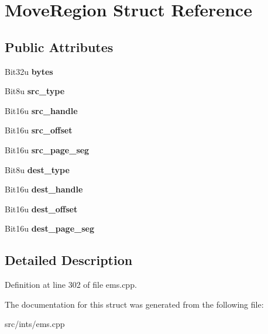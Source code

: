 \hypertarget{structMoveRegion}{\section{Move\-Region Struct Reference}
\label{structMoveRegion}
}
\subsection*{Public Attributes}
\begin{DoxyCompactItemize}
\item 
\hypertarget{structMoveRegion_ada38b05b3446e335d841d650849f9d5d}{Bit32u {\bfseries bytes}}\label{structMoveRegion_ada38b05b3446e335d841d650849f9d5d}

\item 
\hypertarget{structMoveRegion_a58be32d3a89f3d138f8e5f9b2f6ac045}{Bit8u {\bfseries src\-\_\-type}}\label{structMoveRegion_a58be32d3a89f3d138f8e5f9b2f6ac045}

\item 
\hypertarget{structMoveRegion_a63311208059116f9fe35ab840928bdf1}{Bit16u {\bfseries src\-\_\-handle}}\label{structMoveRegion_a63311208059116f9fe35ab840928bdf1}

\item 
\hypertarget{structMoveRegion_a342eb6b4ff673d978a2b532458fa74a6}{Bit16u {\bfseries src\-\_\-offset}}\label{structMoveRegion_a342eb6b4ff673d978a2b532458fa74a6}

\item 
\hypertarget{structMoveRegion_a69313d022b4712a2e78f6e34458ed10c}{Bit16u {\bfseries src\-\_\-page\-\_\-seg}}\label{structMoveRegion_a69313d022b4712a2e78f6e34458ed10c}

\item 
\hypertarget{structMoveRegion_a4475c59b94e5a93417ef80e4af630926}{Bit8u {\bfseries dest\-\_\-type}}\label{structMoveRegion_a4475c59b94e5a93417ef80e4af630926}

\item 
\hypertarget{structMoveRegion_a0f2a0c0e9a72bf10b5098fcd5f6a6379}{Bit16u {\bfseries dest\-\_\-handle}}\label{structMoveRegion_a0f2a0c0e9a72bf10b5098fcd5f6a6379}

\item 
\hypertarget{structMoveRegion_a992589a76ab78cf0708ab6adcda44348}{Bit16u {\bfseries dest\-\_\-offset}}\label{structMoveRegion_a992589a76ab78cf0708ab6adcda44348}

\item 
\hypertarget{structMoveRegion_aadb6e580104ef5f4668505b860d01f3f}{Bit16u {\bfseries dest\-\_\-page\-\_\-seg}}\label{structMoveRegion_aadb6e580104ef5f4668505b860d01f3f}

\end{DoxyCompactItemize}


\subsection{Detailed Description}


Definition at line 302 of file ems.\-cpp.



The documentation for this struct was generated from the following file\-:\begin{DoxyCompactItemize}
\item 
src/ints/ems.\-cpp\end{DoxyCompactItemize}
